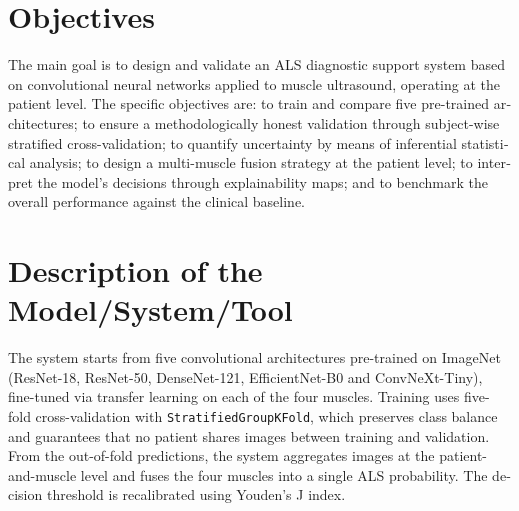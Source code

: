 \documentclass[12pt]{extarticle}
\numberwithin{equation}{section}
\newcommand{\sectionnotoc}[1]{%
    \refstepcounter{section}%
    \section*{\thesection\quad #1}%
}
\begin{document}
\begin{otherlanguage}{english}
\begin{refsection}
\sectionnotoc{Objectives}

The main goal is to design and validate an ALS diagnostic support system based on convolutional neural networks applied to muscle ultrasound, operating at the patient level. The specific objectives are: to train and compare five pre-trained architectures; to ensure a methodologically honest validation through subject-wise stratified cross-validation; to quantify uncertainty by means of inferential statistical analysis; to design a multi-muscle fusion strategy at the patient level; to interpret the model's decisions through explainability maps; and to benchmark the overall performance against the clinical baseline.

\sectionnotoc{Description of the Model/System/Tool}

The system starts from five convolutional architectures pre-trained on ImageNet (ResNet-18, ResNet-50, DenseNet-121, EfficientNet-B0 and ConvNeXt-Tiny), fine-tuned via transfer learning on each of the four muscles. Training uses five-fold cross-validation with \texttt{Stratified\allowbreak Group\allowbreak KFold}, which preserves class balance and guarantees that no patient shares images between training and validation. From the out-of-fold predictions, the system aggregates images at the patient-and-muscle level and fuses the four muscles into a single ALS probability. The decision threshold is recalibrated using Youden's J index.

\begin{figure}[H]
    \centering
\end{figure}
\end{refsection}
\end{otherlanguage}
\end{document}
